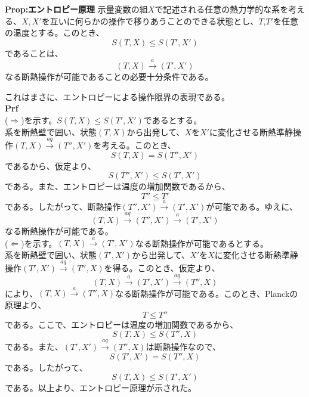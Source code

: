 \documentclass[a4paper,11pt]{jsarticle}
\numberwithin{equation}{section}
\begin{document}
\begin{itembox}[l]{\textbf{Prop:エントロピー原理}}
    示量変数の組$X$で記述される任意の熱力学的な系を考える、$X,X'$を互いに何らかの操作で移りあうことのできる状態とし、$T$,$T'$を任意の温度とする。このとき、
    \begin{equation}
        S(T,X) \leq S(T',X')
    \end{equation}
    であることは、
    \begin{equation}
        (T,X) \xrightarrow{a} (T',X')
    \end{equation}
    なる断熱操作が可能であることの必要十分条件である。
\end{itembox}
これはまさに、エントロピーによる操作限界の表現である。\\
\textbf{Prf}\\
($\Rightarrow$)を示す。$S(T,X) \leq S(T',X')$であるとする。\\
系を断熱壁で囲い、状態$(T,X)$から出発して、$X$を$X'$に変化させる断熱準静操作$(T,X)\xrightarrow{aq}(T'',X')$を考える。このとき、
\begin{equation}
    S(T,X) = S(T'',X')
\end{equation}
であるから、仮定より、
\begin{equation}
    S(T'',X') \leq S(T',X')
\end{equation}
である。また、エントロピーは温度の増加関数であるから、
\begin{equation}
    T'' \leq T'
\end{equation}
である。したがって、断熱操作$(T'',X')\xrightarrow{a}(T',X')$が可能である。ゆえに、
\begin{equation}
    (T,X) \xrightarrow{aq} (T'',X') \xrightarrow{a} (T',X')
\end{equation}
なる断熱操作が可能である。\\
($\Leftarrow$)を示す。$(T,X)\xrightarrow{a}(T',X')$なる断熱操作が可能であるとする。\\
系を断熱壁で囲い、状態$(T',X')$から出発して、$X'$を$X$に変化させる断熱準静操作$(T',X')\xrightarrow{aq}(T'',X)$を得る。このとき、仮定より、
\begin{equation}
    (T,X) \xrightarrow{a} (T',X') \xrightarrow{aq} (T'',X)
\end{equation}
により、$(T,X)\xrightarrow{a}(T'',X)$なる断熱操作が可能である。このとき、Planckの原理より、
\begin{equation}
    T \leq T''
\end{equation}
である。ここで、エントロピーは温度の増加関数であるから、
\begin{equation}
    S(T,X) \leq S(T'',X)
\end{equation}
である。また、$(T',X')\xrightarrow{aq}(T'',X)$は断熱操作なので、
\begin{equation}
    S(T',X') = S(T'',X)
\end{equation}
である。したがって、
\begin{equation}
    S(T,X) \leq S(T',X')
\end{equation}
である。以上より、エントロピー原理が示された。\\
\end{document}
